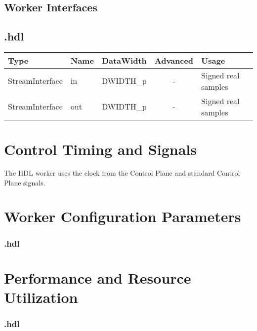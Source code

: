 \begin{landscape}
	\section*{Worker Interfaces}
	\subsection*{\comp.hdl}
	\begin{scriptsize}
		\begin{tabular}{|M{2cm}|M{1.5cm}|c|c|p{12cm}|}
			\hline
			Type            & Name & DataWidth 		& Advanced  & Usage                 \\
			\hline
			StreamInterface & in   & DWIDTH\_p		& - 		& Signed real samples 	\\
			\hline
			StreamInterface & out  & DWIDTH\_p		& -			& Signed real samples 	\\
			\hline
		\end{tabular}
	\end{scriptsize}
\end{landscape}

\section*{Control Timing and Signals}
\begin{flushleft}
	The \Comp{} HDL worker uses the clock from the Control Plane and standard Control Plane signals.\\
\end{flushleft}

\begin{landscape}
\section*{Worker Configuration Parameters}
\subsubsection*{\comp.hdl}
%
\section*{Performance and Resource Utilization}
\subsubsection*{\comp.hdl}
%
\end{landscape}
